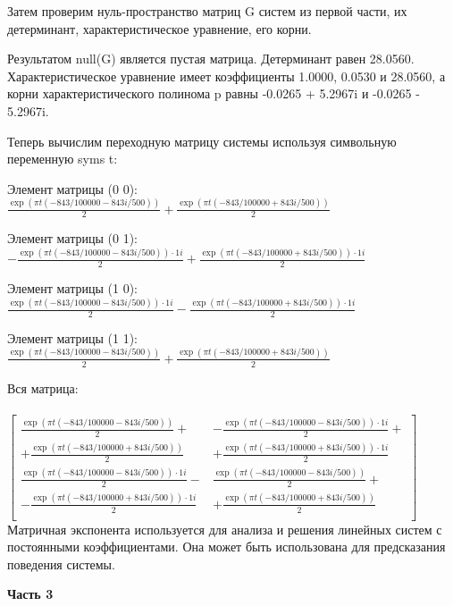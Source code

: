 \documentclass[a4paper,oneside,14pt]{extreport}
\begin{document}
Затем проверим нуль-пространство матриц G систем из первой части, их детерминант, характеристическое уравнение, его корни.

Результатом null(G) является пустая матрица. Детерминант равен 28.0560. Характеристическое уравнение имеет коэффициенты 1.0000, 0.0530 и 28.0560, а корни характеристического полинома p равны -0.0265 + 5.2967i и -0.0265 - 5.2967i.

Теперь вычислим переходную матрицу системы используя символьную переменную syms t:

Элемент матрицы (0 0):
\\
\noindent $\frac{\exp(\pi t (- 843/100000 - 843i/500))}{2} + \frac{\exp(\pi t (- 843/100000 + 843i/500))}{2}$

Элемент матрицы (0 1):
\\
\noindent $-\frac{\exp(\pi t (- 843/100000 - 843i/500))\cdot 1i}{2} + \frac{\exp(\pi t (- 843/100000 + 843i/500))\cdot 1i}{2}$

Элемент матрицы (1 0):
\\
\noindent $\frac{\exp(\pi t (- 843/100000 - 843i/500))\cdot 1i}{2} - \frac{\exp(\pi t (- 843/100000 + 843i/500))\cdot 1i}{2}$

Элемент матрицы (1 1):
\\
\noindent $\frac{\exp(\pi t (- 843/100000 - 843i/500))}{2} + \frac{\exp(\pi t (- 843/100000 + 843i/500))}{2}$

Вся матрица:
\\ \\
\noindent $\begin{bmatrix}
	\frac{\exp(\pi t (- 843/100000 - 843i/500))}{2} + & -\frac{\exp(\pi t (- 843/100000 - 843i/500))\cdot 1i}{2} + \\
	+ \frac{\exp(\pi t (- 843/100000 + 843i/500))}{2} & + \frac{\exp(\pi t (- 843/100000 + 843i/500))\cdot 1i}{2} \\
	\frac{\exp(\pi t (- 843/100000 - 843i/500))\cdot 1i}{2} - & \frac{\exp(\pi t (- 843/100000 - 843i/500))}{2} + \\
	- \frac{\exp(\pi t (- 843/100000 + 843i/500))\cdot 1i}{2} &  + \frac{\exp(\pi t (- 843/100000 + 843i/500))}{2} \\
\end{bmatrix}$
\\

Матричная экспонента используется для анализа и решения линейных систем с постоянными коэффициентами. Она может быть использована для предсказания поведения системы.

\newpage
\textbf{Часть 3}
\end{document}
